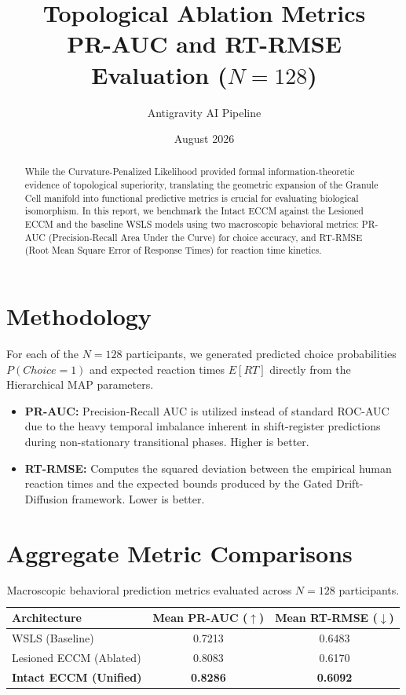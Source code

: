 \documentclass[11pt,a4paper]{article}
\title{\textbf{Topological Ablation Metrics}\\ \Large PR-AUC and RT-RMSE Evaluation ($N=128$)}
\author{Antigravity AI Pipeline}
\date{August 2026}
\begin{document}
\maketitle

\begin{abstract}
While the Curvature-Penalized Likelihood provided formal information-theoretic evidence of topological superiority, translating the geometric expansion of the Granule Cell manifold into functional predictive metrics is crucial for evaluating biological isomorphism. In this report, we benchmark the Intact ECCM against the Lesioned ECCM and the baseline WSLS models using two macroscopic behavioral metrics: PR-AUC (Precision-Recall Area Under the Curve) for choice accuracy, and RT-RMSE (Root Mean Square Error of Response Times) for reaction time kinetics.
\end{abstract}

\section{Methodology}
For each of the $N=128$ participants, we generated predicted choice probabilities $P(Choice=1)$ and expected reaction times $E[RT]$ directly from the Hierarchical MAP parameters. 

\begin{itemize}
    \item \textbf{PR-AUC:} Precision-Recall AUC is utilized instead of standard ROC-AUC due to the heavy temporal imbalance inherent in shift-register predictions during non-stationary transitional phases. Higher is better.
    \item \textbf{RT-RMSE:} Computes the squared deviation between the empirical human reaction times and the expected bounds produced by the Gated Drift-Diffusion framework. Lower is better.
\end{itemize}

\section{Aggregate Metric Comparisons}

\begin{table}[h!]
    \centering
    \begin{tabular}{lcc}
        \toprule
        \textbf{Architecture} & \textbf{Mean PR-AUC ($\uparrow$)} & \textbf{Mean RT-RMSE ($\downarrow$)} \\
        \midrule
        WSLS (Baseline) & 0.7213 & 0.6483 \\ 
        Lesioned ECCM (Ablated) & 0.8083 & 0.6170 \\ 
        \textbf{Intact ECCM (Unified)} & \textbf{0.8286} & \textbf{0.6092} \\ 
        \bottomrule
    \end{tabular}
    \caption{Macroscopic behavioral prediction metrics evaluated across $N=128$ participants.}
\end{table}
\end{document}
